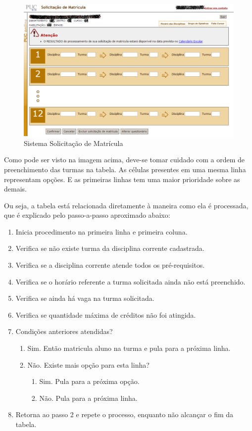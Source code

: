 \documentclass[graduacao,brazil]{ThesisPUC}
\begin{document}
\begin{figure}[H]
    \centering
    \includegraphics[width=\linewidth]{img/puc_online_antigo.png}
    \caption{Sistema Solicitação de Matrícula}
\end{figure}

Como pode ser visto na imagem acima, deve-se tomar cuidado com a ordem de preenchimento das turmas na tabela. As células presentes em uma mesma linha representam opções. E as primeiras linhas tem uma maior prioridade sobre as demais.

Ou seja, a tabela está relacionada diretamente à maneira como ela é processada, que é explicado pelo passo-a-passo aproximado abaixo:

 \begin{enumerate}
 
 	\item Inicia procedimento na primeira linha e primeira coluna.
 	\item Verifica se não existe turma da disciplina corrente cadastrada.
 	\item Verifica se a disciplina corrente atende todos os pré-requisitos.
 	\item Verifica se o horário referente a turma solicitada ainda não está preenchido.
 	\item Verifica se ainda há vaga na turma solicitada.
 	\item Verifica se quantidade máxima de créditos não foi atingida.
 	\item Condições anteriores atendidas?
 	\begin{enumerate}
 		\item  Sim. Então matricula aluno na turma e pula para a próxima linha. 
 		\item  Não. Existe mais opção para esta linha?
 		\begin{enumerate}
 			\item Sim. Pula para a próxima opção.
 			\item Não. Pula para a próxima linha.
 		\end{enumerate}
 	\end{enumerate}
 	\item Retorna ao passo 2 e repete o processo, enquanto não alcançar o fim da tabela.
 \end{enumerate}
\end{document}
